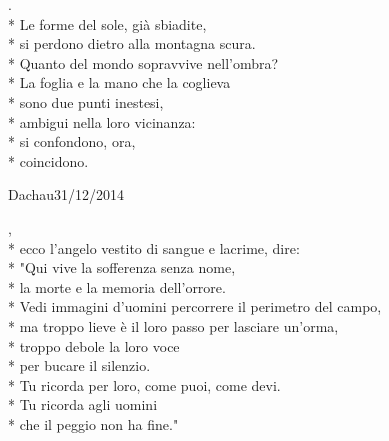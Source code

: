 \documentclass[12pt]{book}
\begin{document}
\begin{poem}{}{}

\settowidth{\versewidth}{non meno è ciò che meriti.}

\begin{altverse}
.\\*
Le forme del sole, già sbiadite, \\*
si perdono dietro alla montagna scura. \\*
Quanto del mondo sopravvive nell'ombra?\\*
La foglia e la mano che la coglieva \\*
sono due punti inestesi, \\*
ambigui nella loro vicinanza: \\*
si confondono, ora, \\*
coincidono.
\end{altverse}

\end{poem}

\begin{poem}{Dachau}{31/12/2014}

\settowidth{\versewidth}{non meno è ciò che meriti.}

\begin{changemargin}{-2cm}{-3cm} 

\begin{altverse}
\quad \qquad {},\\*
ecco l'angelo vestito di sangue e lacrime, dire: \\*
"Qui vive la sofferenza senza nome,\\*
la morte e la memoria dell'orrore. \\*
Vedi immagini d'uomini percorrere il perimetro del campo,\\*
ma troppo lieve è il loro passo per lasciare un'orma,\\*
troppo debole la loro voce\\*
per bucare il silenzio.\\*
Tu ricorda per loro, come puoi, come devi.\\*
Tu ricorda agli uomini\\*
che il peggio non ha fine."
\end{altverse}


\end{changemargin}

\end{poem}
\end{document}
